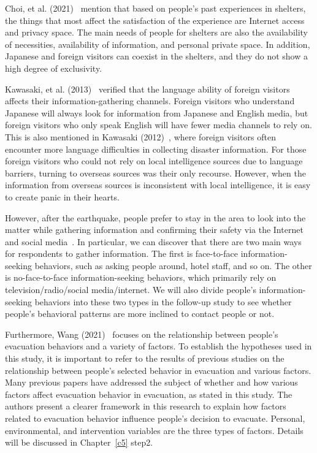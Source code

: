 Choi, et al. (2021)~\cite{ref54} mention that based on people's past experiences in shelters, the things that most affect the satisfaction of the experience are Internet access and privacy space. The main needs of people for shelters are also the availability of necessities, availability of information, and personal private space. In addition, Japanese and foreign visitors can coexist in the shelters, and they do not show a high degree of exclusivity.

Kawasaki, et al. (2013)~\cite{ref52} verified that the language ability of foreign visitors affects their information-gathering channels. Foreign visitors who understand Japanese will always look for information from Japanese and English media, but foreign visitors who only speak English will have fewer media channels to rely on. This is also mentioned in Kawasaki (2012)~\cite{ref48}, where foreign visitors often encounter more language difficulties in collecting disaster information. For those foreign visitors who could not rely on local intelligence sources due to language barriers, turning to overseas sources was their only recourse. However, when the information from overseas sources is inconsistent with local intelligence, it is easy to create panic in their hearts. 



However, after the earthquake, people prefer to stay in the area to look into the matter while gathering information and confirming their safety via the Internet and social media~\cite{ref50}. In particular, we can discover that there are two main ways for respondents to gather information. The first is face-to-face information-seeking behaviors, such as asking people around, hotel staff, and so on. The other is no-face-to-face information-seeking behaviors, which primarily rely on television/radio/social media/internet. We will also divide people's information-seeking behaviors into these two types in the follow-up study to see whether people's behavioral patterns are more inclined to contact people or not. 

Furthermore, Wang (2021)~\cite{ref9} focuses on the relationship between people's evacuation behaviors and a variety of factors. To establish the hypotheses used in this study, it is important to refer to the results of previous studies on the relationship between people's selected behavior in evacuation and various factors. Many previous papers have addressed the subject of whether and how various factors affect evacuation behavior in evacuation, as stated in this study. The authors present a clearer framework in this research to explain how factors related to evacuation behavior influence people's decision to evacuate. Personal, environmental, and intervention variables are the three types of factors. Details will be discussed in Chapter~\ref{c5} step2. 

